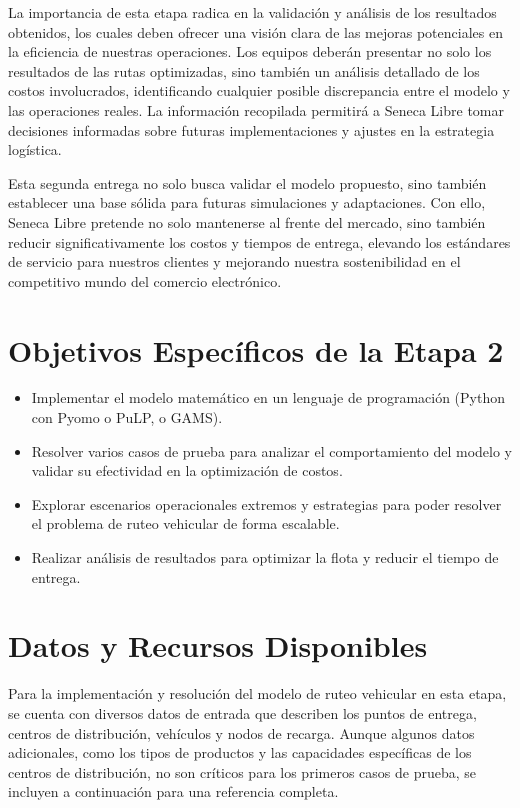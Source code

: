 \documentclass[12pt]{article}
\begin{document}
La importancia de esta etapa radica en la validación y análisis de los resultados obtenidos, los cuales deben ofrecer una visión clara de las mejoras potenciales en la eficiencia de nuestras operaciones. Los equipos deberán presentar no solo los resultados de las rutas optimizadas, sino también un análisis detallado de los costos involucrados, identificando cualquier posible discrepancia entre el modelo y las operaciones reales. La información recopilada permitirá a Seneca Libre tomar decisiones informadas sobre futuras implementaciones y ajustes en la estrategia logística.

Esta segunda entrega no solo busca validar el modelo propuesto, sino también establecer una base sólida para futuras simulaciones y adaptaciones. Con ello, Seneca Libre pretende no solo mantenerse al frente del mercado, sino también reducir significativamente los costos y tiempos de entrega, elevando los estándares de servicio para nuestros clientes y mejorando nuestra sostenibilidad en el competitivo mundo del comercio electrónico.

\section{Objetivos Específicos de la Etapa 2}
\begin{itemize}
    \item Implementar el modelo matemático en un lenguaje de programación (Python con Pyomo o PuLP, o GAMS).
    \item Resolver varios casos de prueba para analizar el comportamiento del modelo y validar su efectividad en la optimización de costos.
    \item Explorar escenarios operacionales extremos y estrategias para poder resolver el problema de ruteo vehicular de forma escalable.
    \item Realizar análisis de resultados para optimizar la flota y reducir el tiempo de entrega.
\end{itemize}

\section{Datos y Recursos Disponibles}

Para la implementación y resolución del modelo de ruteo vehicular en esta etapa, se cuenta con diversos datos de entrada que describen los puntos de entrega, centros de distribución, vehículos y nodos de recarga. Aunque algunos datos adicionales, como los tipos de productos y las capacidades específicas de los centros de distribución, no son críticos para los primeros casos de prueba, se incluyen a continuación para una referencia completa.
\end{document}
